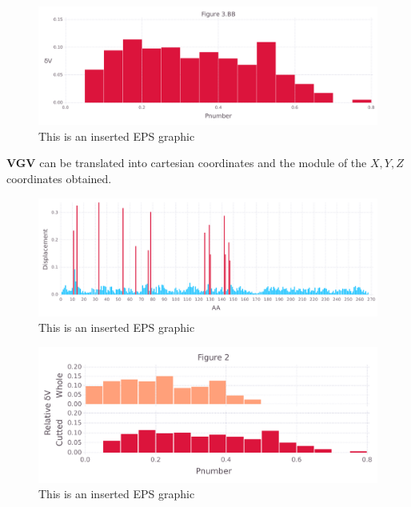 \documentclass[10pt,letterpaper]{article}
\begin{document}
\begin{figure}[ht]
\begin{center}
\includegraphics[scale=0.5]{1xkk/3bbfigure_hi-precision.pdf}
\caption{This is an inserted EPS graphic}
\label{fig11}
\end{center}
\end{figure}

\FloatBarrier


\textbf{VGV} can be translated into cartesian coordinates and the module of the \(X, Y, Z\) coordinates obtained.

\begin{figure}[ht]
\begin{center}
\includegraphics[scale=0.5]{1xkk/5figure_hi-precision.pdf}
\caption{This is an inserted EPS graphic}
\label{fig13}
\end{center}
\end{figure}

\begin{figure}[ht]
\begin{center}
\includegraphics[scale=0.5]{1xkk/3both_figure_hi-precision.pdf}
\caption{This is an inserted EPS graphic}
\label{fig13}
\end{center}
\end{figure}
\end{document}

